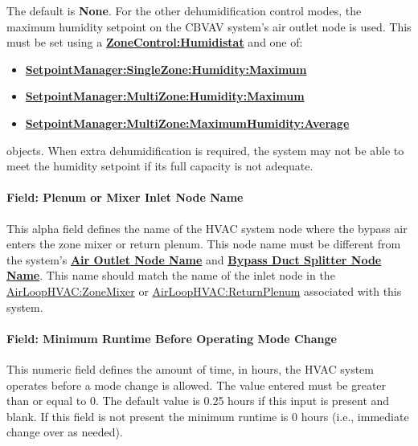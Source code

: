 The default is \textbf{None}. For the other dehumidification control modes, the maximum humidity setpoint on the CBVAV system's air outlet node is used. This must be set using a \textbf{\hyperref[zonecontrolhumidistat]{ZoneControl:Humidistat}} and one of:

\begin{itemize}
\item
  \textbf{\hyperref[setpointmanagersinglezonehumiditymaximum]{SetpointManager:SingleZone:Humidity:Maximum}}
\item
  \textbf{\hyperref[setpointmanagermultizonehumiditymaximum]{SetpointManager:MultiZone:Humidity:Maximum}}
\item
  \textbf{\hyperref[setpointmanagermultizonemaximumhumidityaverage]{SetpointManager:MultiZone:MaximumHumidity:Average}}
\end{itemize}

objects. When extra dehumidification is required, the system may not be able to meet the humidity setpoint if its full capacity is not adequate.

\paragraph{Field: Plenum or Mixer Inlet Node Name}\label{field-bypass-duct-mixer-node-name}

This alpha field defines the name of the HVAC system node where the bypass air enters the zone mixer or return plenum. This node name must be different from the system's \textbf{\hyperref[field-air-outlet-node-name-3-002]{Air Outlet Node Name}} and \textbf{\hyperref[field-bypass-duct-splitter-node-name]{Bypass Duct Splitter Node Name}}. This name should match the name of the inlet node in the \hyperref[airloophvaczonemixer]{AirLoopHVAC:ZoneMixer} or \hyperref[airloophvacreturnplenum]{AirLoopHVAC:ReturnPlenum} associated with this system.

\paragraph{Field: Minimum Runtime Before Operating Mode Change}\label{minimum-runtime-before-operating-mode-change}

This numeric field defines the amount of time, in hours, the HVAC system operates before a mode change is allowed. The value entered must be greater than or equal to 0. The default value is 0.25 hours if this input is present and blank. If this field is not present the minimum runtime is 0 hours (i.e., immediate change over as needed).
\medskip

